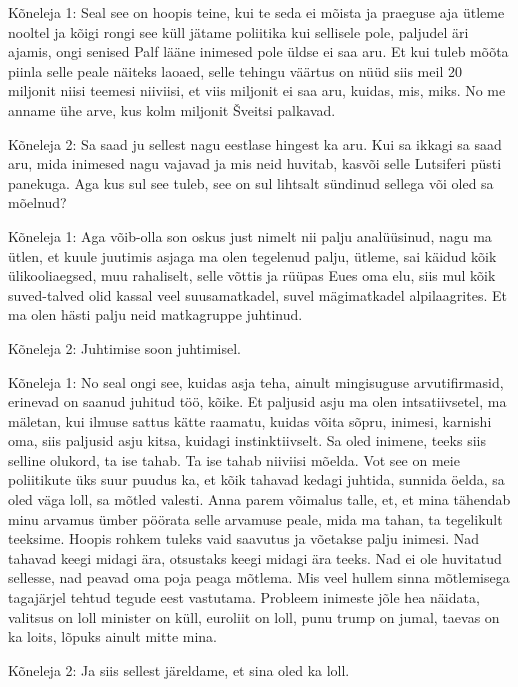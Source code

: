 Kõneleja 1:
Seal see on hoopis teine, kui te seda ei mõista ja praeguse aja ütleme nooltel ja kõigi rongi see küll jätame poliitika kui sellisele pole, paljudel äri ajamis, ongi senised Palf lääne inimesed pole üldse ei saa aru. Et kui tuleb mõõta piinla selle peale näiteks laoaed, selle tehingu väärtus on nüüd siis meil 20 miljonit niisi teemesi niiviisi, et viis miljonit ei saa aru, kuidas, mis, miks. No me anname ühe arve, kus kolm miljonit Šveitsi palkavad.
                 
Kõneleja 2:
Sa saad ju sellest nagu eestlase hingest ka aru. Kui sa ikkagi sa saad aru, mida inimesed nagu vajavad ja mis neid huvitab, kasvõi selle Lutsiferi püsti panekuga.
Aga kus sul see tuleb, see on sul lihtsalt sündinud sellega või oled sa mõelnud?
                 
Kõneleja 1:
Aga võib-olla son oskus just nimelt nii palju analüüsinud, nagu ma ütlen, et kuule juutimis asjaga ma olen tegelenud palju, ütleme, sai käidud kõik ülikooliaegsed, muu rahaliselt, selle võttis ja rüüpas Eues oma elu, siis mul kõik suved-talved olid kassal veel suusamatkadel, suvel mägimatkadel alpilaagrites. Et ma olen hästi palju neid matkagruppe juhtinud.
                 
Kõneleja 2:
Juhtimise soon juhtimisel.
                 
Kõneleja 1:
No seal ongi see, kuidas asja teha, ainult mingisuguse arvutifirmasid, erinevad on saanud juhitud töö, kõike. Et paljusid asju ma olen intsatiivsetel, ma mäletan, kui ilmuse sattus kätte raamatu, kuidas võita sõpru, inimesi, karnishi oma, siis paljusid asju kitsa, kuidagi instinktiivselt.
Sa oled inimene, teeks siis selline olukord, ta ise tahab. Ta ise tahab niiviisi mõelda. Vot see on meie poliitikute üks suur puudus ka, et kõik tahavad kedagi juhtida, sunnida öelda, sa oled väga loll, sa mõtled valesti. Anna parem võimalus talle, et, et mina tähendab minu arvamus ümber pöörata selle arvamuse peale, mida ma tahan, ta tegelikult teeksime.
Hoopis rohkem tuleks vaid saavutus ja võetakse palju inimesi. Nad tahavad keegi midagi ära, otsustaks keegi midagi ära teeks. Nad ei ole huvitatud sellesse, nad peavad oma poja peaga mõtlema. Mis veel hullem sinna mõtlemisega tagajärjel tehtud tegude eest vastutama. Probleem inimeste jõle hea näidata, valitsus on loll minister on küll, euroliit on loll, punu trump on jumal, taevas on ka loits, lõpuks ainult mitte mina.
                 
Kõneleja 2:
Ja siis sellest järeldame, et sina oled ka loll.
                 
